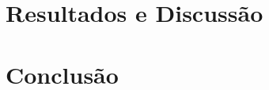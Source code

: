 \documentclass[
	12pt,				%
	oneside,			%
	a4paper,			%
	english,			%
	french,				%
	spanish,			%
	brazil,				%
	]{abntex2}
\begin{document}

\newpage

\section[Resultados e Discussão]{Resultados e Discussão}
\pagestyle{fancy}



\newpage
\section[Conclusão]{Conclusão}
\pagestyle{fancy}
\end{document}
